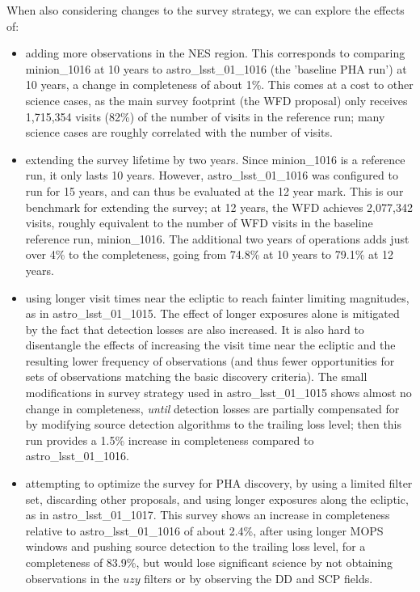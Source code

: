 When also considering changes to the survey strategy, we can explore the effects of:
\begin{itemize}
\item adding more observations in the NES region. This corresponds to comparing minion\_1016 at 10 years to astro\_lsst\_01\_1016 (the 'baseline PHA run') at 10 years, a change in completeness of about 1\%. This comes at a cost to other science cases, as the main survey footprint (the WFD proposal) only receives 1,715,354 visits (82\%) of the number of visits in the reference run; many science cases are roughly correlated with the number of visits. 
\item extending the survey lifetime by two years. Since minion\_1016 is a reference run, it only lasts 10 years. However, astro\_lsst\_01\_1016 was configured to run for 15 years, and can thus be evaluated at the 12 year mark. This is our benchmark for extending the survey; at 12 years, the WFD achieves 2,077,342 visits, roughly equivalent to the number of WFD visits in the baseline reference run, minion\_1016.  The additional two years of operations adds just over 4\% to the completeness, going from 74.8\% at 10 years to 79.1\% at 12 years. 
\item using longer visit times near the ecliptic to reach fainter limiting magnitudes, as in astro\_lsst\_01\_1015. The effect of longer exposures alone is mitigated by the fact that detection losses are also increased. It is also hard to disentangle the effects of increasing the visit time near the ecliptic and the resulting lower frequency of observations (and thus fewer opportunities for sets of observations matching the basic discovery criteria). The small modifications in survey strategy used in astro\_lsst\_01\_1015 shows almost no change in completeness, {\it until} detection losses are partially compensated for by modifying source detection algorithms to the trailing loss level; then this run provides a 1.5\% increase in completeness compared to astro\_lsst\_01\_1016. 
\item attempting to optimize the survey for PHA discovery, by using a limited filter set, discarding other proposals, and using longer exposures along the ecliptic, as in astro\_lsst\_01\_1017. This survey shows an increase in completeness relative to astro\_lsst\_01\_1016 of about 2.4\%, after using longer MOPS windows and pushing source detection to the trailing loss level, for a  completeness of 83.9\%, but would lose significant science by not obtaining observations in the $uzy$ filters or by observing the DD and SCP fields.
\end{itemize}

